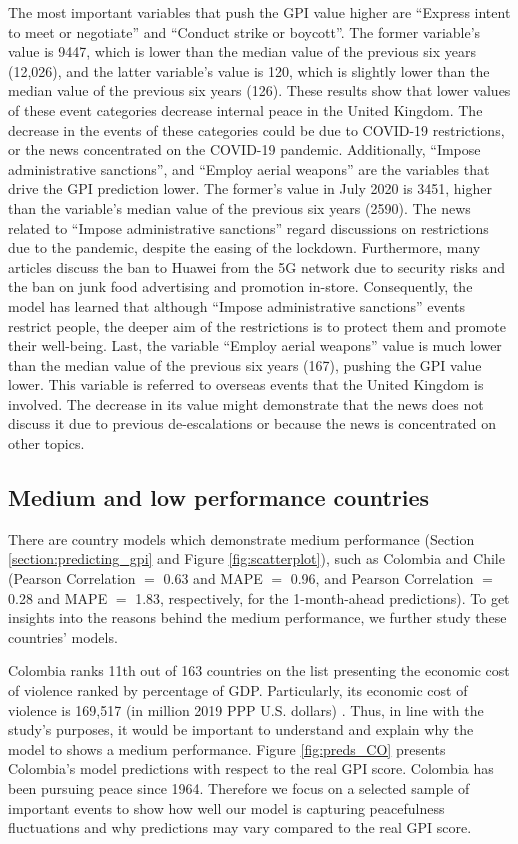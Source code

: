 \documentclass{bmcart}
\begin{document}
The most important variables that push the GPI value higher are ``Express intent to meet or negotiate'' and ``Conduct strike or boycott''. 
The former variable's value is 9447, which is lower than the median value of the previous six years (12,026), and the latter variable's value is 120, which is slightly lower than the median value of the previous six years (126). 
These results show that lower values of these event categories decrease internal peace in the United Kingdom. The decrease in the events of these categories could be due to COVID-19 restrictions, or the news concentrated on the COVID-19 pandemic. 
Additionally, ``Impose administrative sanctions'', and ``Employ aerial weapons'' are the variables that drive the GPI prediction lower. The former's value in July 2020 is 3451, higher than the variable's median value of the previous six years (2590). 
The news related to ``Impose administrative sanctions'' regard discussions on restrictions due to the pandemic, despite the easing of the lockdown. 
Furthermore, many articles discuss the ban to Huawei from the 5G network due to security risks and the ban on junk food advertising and promotion in-store. Consequently, the model has learned that although ``Impose administrative sanctions'' events restrict people, the deeper aim of the restrictions is to protect them and promote their well-being. Last, the variable ``Employ aerial weapons'' value is much lower than the median value of the previous six years (167), pushing the GPI value lower. This variable is referred to overseas events that the United Kingdom is involved. The decrease in its value might demonstrate that the news does not discuss it due to previous de-escalations or because the news is concentrated on other topics.

\subsection{Medium and low performance countries}
\label{section:medium}
There are country models which demonstrate medium performance (Section \ref{section:predicting_gpi} and Figure \ref{fig:scatterplot}), such as Colombia and Chile (Pearson Correlation $=$ 0.63 and MAPE $=$ 0.96, and Pearson Correlation $=$ 0.28 and MAPE $=$ 1.83, respectively, for the 1-month-ahead predictions).
To get insights into the reasons behind the medium performance, we further study these countries' models.

Colombia ranks 11th out of 163 countries on the list presenting the economic cost of violence ranked by percentage of GDP. Particularly, its economic cost of violence is 169,517 (in million 2019 PPP U.S. dollars) \cite{gpi_report_2020}. Thus, in line with the study's purposes, it would be important to understand and explain why the model to shows a medium performance. 
Figure \ref{fig:preds_CO} presents Colombia's model predictions with respect to the real GPI score. 
Colombia has been pursuing peace since 1964. 
Therefore we focus on a selected sample of important events to show how well our model is capturing peacefulness fluctuations and why predictions may vary compared to the real GPI score. 
\end{document}
